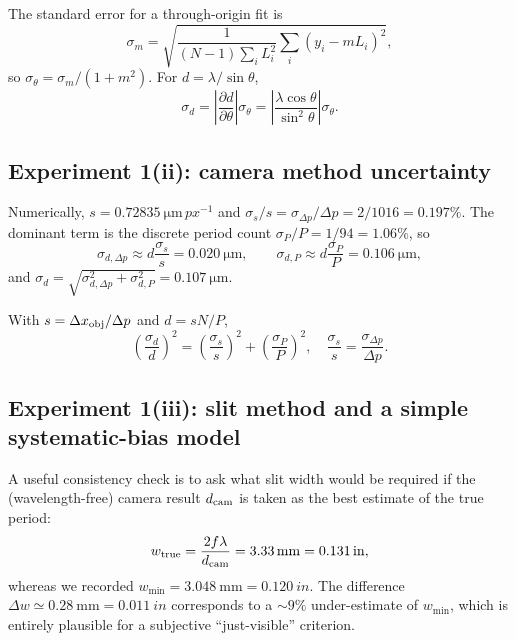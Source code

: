 \documentclass[10pt,twocolumn]{article}
\begin{document}
 The standard error for a through-origin fit is
\begin{equation}
\sigma_m = \sqrt{\frac{1}{(N-1)\sum_i L_i^2}\sum_i (y_i-mL_i)^2},
\end{equation}
so $\sigma_\theta = \sigma_m/(1+m^2)$. For $d=\lambda/\sin\theta$,
\begin{equation}
\sigma_d = \left|\frac{\partial d}{\partial \theta}\right|\sigma_\theta
= \left|\frac{\lambda\cos\theta}{\sin^2\theta}\right|\sigma_\theta.
\end{equation}

\subsection{Experiment 1(ii): camera method uncertainty}

Numerically, $s=\SI{0.72835}{\micro\meter\,px^{-1}}$ and $\sigma_s/s=\sigma_{\Delta p}/\Delta p=2/1016=0.197\%$.
The dominant term is the discrete period count $\sigma_P/P=1/94=1.06\%$, so
\begin{equation}
\sigma_{d,\Delta p}\approx d\frac{\sigma_s}{s}=\SI{0.020}{\micro\meter},\qquad
\sigma_{d,P}\approx d\frac{\sigma_P}{P}=\SI{0.106}{\micro\meter},
\end{equation}
and $\sigma_d=\sqrt{\sigma_{d,\Delta p}^2+\sigma_{d,P}^2}=\SI{0.107}{\micro\meter}$.


With $s=\Delta x_{\rm obj}/\Delta p$ and $d=sN/P$,
\begin{equation}
\left(\frac{\sigma_d}{d}\right)^2 = \left(\frac{\sigma_s}{s}\right)^2 + \left(\frac{\sigma_P}{P}\right)^2,
\quad
\frac{\sigma_s}{s}=\frac{\sigma_{\Delta p}}{\Delta p}.
\end{equation}

\subsection{Experiment 1(iii): slit method and a simple systematic-bias model}

A useful consistency check is to ask what slit width would be required if the (wavelength-free) camera
result $d_{\rm cam}$ is taken as the best estimate of the true period:
\begin{equation}
w_{\rm true}=\frac{2f\lambda}{d_{\rm cam}}=\SI{3.33}{\milli\meter}=\SI{0.131}{in},
\end{equation}
whereas we recorded $w_{\min}=\SI{3.048}{\milli\meter}=\SI{0.120}{in}$. The difference
$\Delta w\simeq\SI{0.28}{\milli\meter}=\SI{0.011}{in}$ corresponds to a $\sim9\%$ under-estimate of
$w_{\min}$, which is entirely plausible for a subjective ``just-visible'' criterion.
\end{document}
